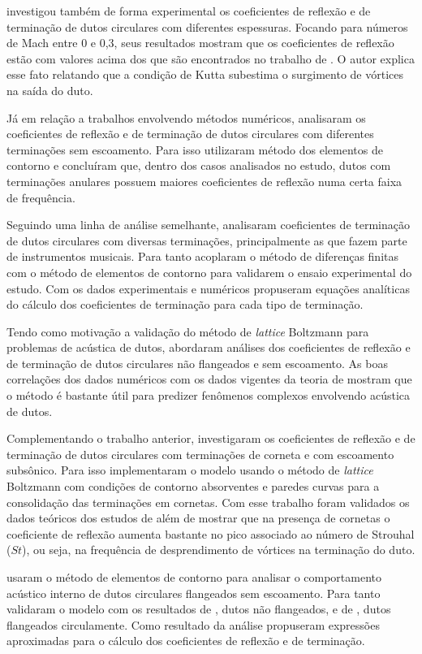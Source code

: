  investigou também de forma experimental os coeficientes de reflexão e de terminação de dutos circulares com diferentes espessuras. Focando para números de Mach entre 0 e 0,3, seus resultados mostram que os coeficientes de reflexão estão com valores acima dos que são encontrados no trabalho de . O autor explica esse fato relatando que a condição de Kutta subestima o surgimento de vórtices na saída do duto.

Já em relação a trabalhos envolvendo métodos numéricos,  analisaram os coeficientes de reflexão e de terminação de dutos circulares com diferentes terminações sem escoamento. Para isso utilizaram método dos elementos de contorno e concluíram que, dentro dos casos analisados no estudo, dutos com terminações anulares possuem maiores coeficientes de reflexão numa certa faixa de frequência.

Seguindo uma linha de análise semelhante,  analisaram coeficientes de terminação de dutos circulares com diversas terminações, principalmente as que fazem parte de instrumentos musicais. Para tanto acoplaram o método de diferenças finitas com o método de elementos de contorno para validarem o ensaio experimental do estudo. Com os dados experimentais e numéricos propuseram equações analíticas do cálculo dos coeficientes de terminação para cada tipo de terminação.

Tendo como motivação a validação do método de \textit{lattice} Boltzmann para problemas de acústica de dutos,  abordaram análises dos coeficientes de reflexão e de terminação de dutos circulares não flangeados e sem escoamento. As boas correlações dos dados numéricos com os dados vigentes da teoria de  mostram que o método é bastante útil para predizer fenômenos complexos envolvendo acústica de dutos.

Complementando o trabalho anterior,  investigaram os coeficientes de reflexão e de terminação de dutos circulares com terminações de corneta e com escoamento subsônico. Para isso implementaram o modelo usando o método de \textit{lattice} Boltzmann com condições de contorno absorventes e paredes curvas para a consolidação das terminações em cornetas. Com esse trabalho foram validados os dados teóricos dos estudos de  além de mostrar que na presença de cornetas o coeficiente de reflexão aumenta bastante no pico associado ao número de Strouhal ($St$), ou seja, na frequência de desprendimento de vórtices na terminação do duto.

 usaram o método de elementos de contorno para analisar o comportamento acústico interno de dutos circulares flangeados sem escoamento. Para tanto validaram o modelo com os resultados de , dutos não flangeados, e de , dutos flangeados circulamente. Como resultado da análise propuseram expressões aproximadas para o cálculo dos coeficientes de reflexão e de terminação.   

